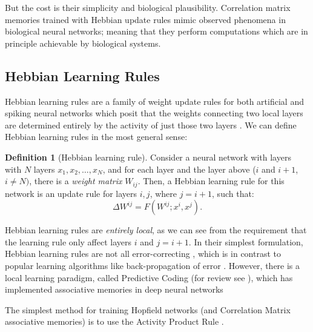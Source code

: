 \documentclass{article}
\theoremstyle{definition}
\newtheorem{definition}{Definition}[subsection]
\begin{document}
But the cost is their simplicity and biological plausibility.
Correlation matrix memories
trained with Hebbian update rules mimic observed phenomena in
biological neural networks; meaning that they perform computations
which are in principle achievable by biological systems.

\subsection{Hebbian Learning Rules}\label{sec:hebbian-learning-rules}


Hebbian learning rules are a family of weight update rules for both
artificial and spiking neural networks which posit that
the weights connecting two local layers are determined entirely
by the activity of just those two layers
\parencites{hebb_organization_1949,sejnowski_hebb_1989}.
We can define Hebbian learning rules in the most general sense:
\begin{definition}[Hebbian learning rule]\label{def:hebbian-learning-rule}
  Consider a neural network with layers with $N$ layers $x_{1}, x_2,
  \dots, x_N$,
  and for each layer and the layer above ($i$ and $i + 1$, $i \neq N)$, there
  is a \textit{weight matrix} $W_{ij}$. Then, a Hebbian learning rule for this
  network is an update rule for layers $i, j$, where $j = i + 1$, such that:
  \begin{equation}
    \Delta W^{ij} = F(W^{ij}; x^i, x^j).
  \end{equation}
\end{definition}

Hebbian learning rules are \textit{entirely local}, as we can see from
the requirement that the learning rule only affect layers $i$ and $j = i + 1$.
In their simplest formulation, Hebbian learning rules are not
all error-correcting \parencite{munakata_how_2006},
which is in contrast to popular learning algorithms
like back-propagation of error \parencite{rumelhart_learning_1986}. However,
there is a local learning paradigm, called Predictive Coding (for review see
\textcite{spratling_review_2017}), which
has implemented associative memories in deep neural networks
\parencite{salvatori_associative_2021}

The simplest method for training Hopfield networks (and Correlation
  Matrix associative
memories) is to use the Activity Product Rule \parencite{haykin_neural_2009}.
\end{document}
